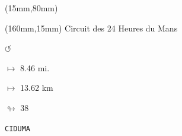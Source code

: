\begin{textblock*}{185mm}(15mm,80mm)%
\end{textblock*}
\begin{textblock*}{40mm}(160mm,15mm)%
Circuit des 24 Heures du Mans
\par \Huge$\circlearrowleft$
\Large
\par$\mapsto$ 8.46 mi.
\par$\mapsto$ 13.62 km
\par$\looparrowright$ 38
\par\hfill\tiny\tt CIDUMA\\
\end{textblock*}
\null\newpage

